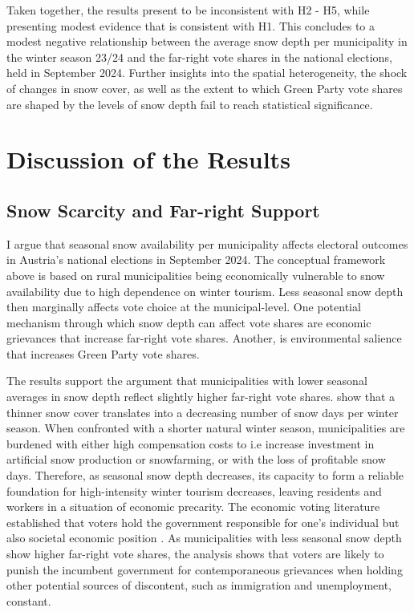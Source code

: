 \documentclass{article}
\begin{document}
Taken together, the results present to be inconsistent with H2 - H5, while presenting modest evidence that is consistent with H1. This concludes to a modest negative relationship between the average snow depth per municipality in the winter season 23/24 and the far-right vote shares in the national elections, held in September 2024. Further insights into the spatial heterogeneity, the shock of changes in snow cover, as well as the extent to which Green Party vote shares are shaped by the levels of snow depth fail to reach statistical significance. 

\vspace{2em}

\begin{table}[H]
  \caption{\textit{Heterogeneity Across Altitude: Interaction Effects}}
  \label{tab:interaction}
  
\end{table}
\newpage

\section{Discussion of the Results}
\subsection{Snow Scarcity and Far-right Support}
I argue that seasonal snow availability per municipality affects electoral outcomes in Austria's national elections in September 2024. The conceptual framework above is based on rural municipalities being economically vulnerable to snow availability due to high dependence on winter tourism. Less seasonal snow depth then marginally affects vote choice at the municipal-level. One potential mechanism through which snow depth can affect vote shares are economic grievances that increase far-right vote shares. Another, is environmental salience that increases Green Party vote shares. 

The results support the argument that municipalities with lower seasonal averages in snow depth reflect slightly higher far-right vote shares. 
\textcite{Olefs2020} show that a thinner snow cover translates into a decreasing number of snow days per winter season. When confronted with a shorter natural winter season, municipalities are burdened with either high compensation costs to i.e increase investment in artificial snow production or snowfarming, or with the loss of profitable snow days. Therefore, as  seasonal snow depth decreases, its capacity to form a reliable foundation for high-intensity winter tourism decreases, leaving residents and workers in a situation of economic precarity. The economic voting literature established that voters hold the government responsible for one's individual but also societal economic position \parencite{Duch2006, LEWISBECK2011288, Habersack2024}. As municipalities with less seasonal snow depth show higher far-right vote shares, the analysis shows that voters are likely to punish the incumbent government for contemporaneous grievances when holding other potential sources of discontent, such as immigration and unemployment, constant. 
\end{document}
